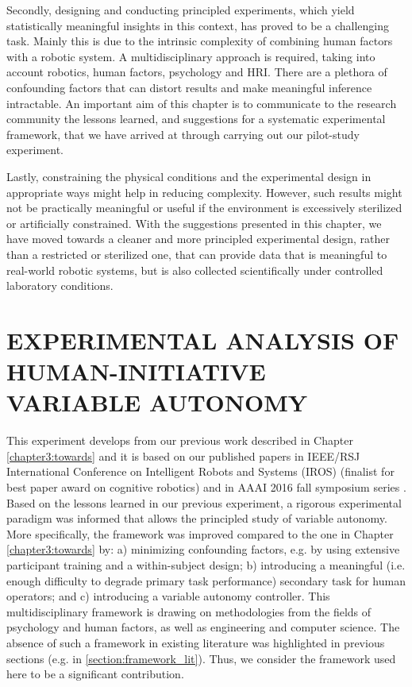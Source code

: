 \documentclass[a4paper,12pt,oneside,openright]{bhamthesis}
\begin{document}
Secondly, designing and conducting principled experiments, which yield statistically meaningful insights in this context, has proved to be a challenging task. Mainly this is due to the intrinsic complexity of combining human factors with a robotic system. A multidisciplinary approach is required, taking into account robotics, human factors, psychology and HRI. There are a plethora of confounding factors that can distort results and make meaningful inference intractable. An important aim of this chapter is to communicate to the research community the lessons learned, and suggestions for a systematic experimental framework, that we have arrived at through carrying out our pilot-study experiment.

Lastly, constraining the physical conditions and the experimental design in appropriate ways might help in reducing complexity. However, such results might not be practically meaningful or useful if the environment is excessively sterilized or artificially constrained. With the suggestions presented in this chapter, we have moved towards a cleaner and more principled experimental design, rather than a restricted or sterilized one, that can provide data that is meaningful to real-world robotic systems, but is also collected scientifically under controlled laboratory conditions.

\chapter{EXPERIMENTAL ANALYSIS OF HUMAN-INITIATIVE VARIABLE AUTONOMY}\label{chapter4:HI}
This experiment develops from our previous work described in Chapter \ref{chapter3:towards} and it is based on our published papers in IEEE/RSJ International Conference on Intelligent Robots and Systems (IROS) \citep{Chiou2016} (finalist for best paper award on cognitive robotics) and in AAAI 2016 fall symposium series \citep{Chiou2016_AAAI}. Based on the lessons learned in our previous experiment, a rigorous experimental paradigm was informed that allows the principled study of variable autonomy. More specifically, the framework was improved compared to the one in Chapter \ref{chapter3:towards} by: a) minimizing confounding factors, e.g. by using extensive participant training and a within-subject design; b) introducing a meaningful (i.e. enough difficulty to degrade primary task performance) secondary task for human operators; and c) introducing a variable autonomy controller.  This multidisciplinary framework is drawing on methodologies from the fields of psychology and human factors, as well as engineering and computer science. The absence of such a framework in existing literature was highlighted in previous sections (e.g. in \ref{section:framework_lit}). Thus, we consider the framework used here to be a significant contribution.
\end{document}
